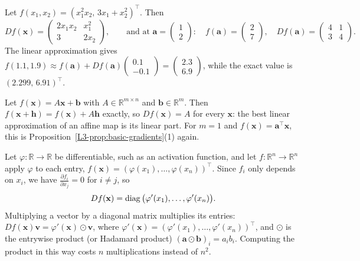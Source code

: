 \begin{example}\label{L3-ex:jacobian}
    Let $f(x_1, x_2) = (x_1^2 x_2, \, 3x_1 + x_2^2)^\top$. Then
    \[Df(\mathbf{x}) = \begin{pmatrix} 2x_1 x_2 & x_1^2 \\ 3 & 2x_2 \end{pmatrix}, \qquad \text{and at } \mathbf{a} = \begin{pmatrix} 1 \\ 2 \end{pmatrix}: \quad f(\mathbf{a}) = \begin{pmatrix} 2 \\ 7 \end{pmatrix}, \quad Df(\mathbf{a}) = \begin{pmatrix} 4 & 1 \\ 3 & 4 \end{pmatrix}.\]
    The linear approximation gives $f(1.1, 1.9) \approx f(\mathbf{a}) + Df(\mathbf{a}) \begin{pmatrix} 0.1 \\ -0.1 \end{pmatrix} = \begin{pmatrix} 2.3 \\ 6.9 \end{pmatrix}$, while the exact value is $(2.299, \, 6.91)^\top$.
\end{example}

\begin{example}\label{L3-ex:affine-jacobian}
    Let $f(\mathbf{x}) = A\mathbf{x} + \mathbf{b}$ with $A \in \mathbb{R}^{m \times n}$ and $\mathbf{b} \in \mathbb{R}^m$. Then $f(\mathbf{x} + \mathbf{h}) = f(\mathbf{x}) + A\mathbf{h}$ exactly, so $Df(\mathbf{x}) = A$ for every $\mathbf{x}$: the best linear approximation of an affine map is its linear part. For $m = 1$ and $f(\mathbf{x}) = \mathbf{a}^\top \mathbf{x}$, this is Proposition~\ref{L3-prop:basic-gradients}(1) again.
\end{example}

\begin{example}\label{L3-ex:entrywise}
    Let $\varphi: \mathbb{R} \to \mathbb{R}$ be differentiable, such as an activation function, and let $f: \mathbb{R}^n \to \mathbb{R}^n$ apply $\varphi$ to each entry, $f(\mathbf{x}) = (\varphi(x_1), \ldots, \varphi(x_n))^\top$. Since $f_i$ only depends on $x_i$, we have $\frac{\partial f_i}{\partial x_j} = 0$ for $i \neq j$, so
    \[Df(\mathbf{x}) = \operatorname{diag}\big(\varphi'(x_1), \ldots, \varphi'(x_n)\big).\]
    Multiplying a vector by a diagonal matrix multiplies its entries: $Df(\mathbf{x})\mathbf{v} = \varphi'(\mathbf{x}) \odot \mathbf{v}$, where $\varphi'(\mathbf{x}) = (\varphi'(x_1), \ldots, \varphi'(x_n))^\top$, and $\odot$ is the entrywise product (or Hadamard product) $(\mathbf{a} \odot \mathbf{b})_i = a_i b_i$. Computing the product in this way costs $n$ multiplications instead of $n^2$.
\end{example}


